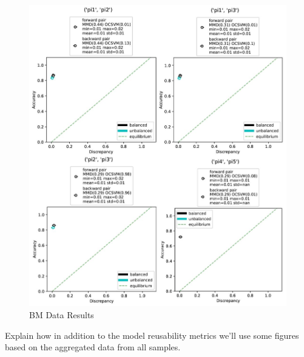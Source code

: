 \documentclass{mpaper}
\begin{document}
\begin{figure}
    \centering
    \includegraphics[scale= 0.5]{bm_results.JPG}
    \caption{BM Data Results}
    \label{fig:bm_results}
\end{figure}




Explain how in addition to the model reusability metrics we'll use some figures based on the aggregated data from all samples.


\end{document}
